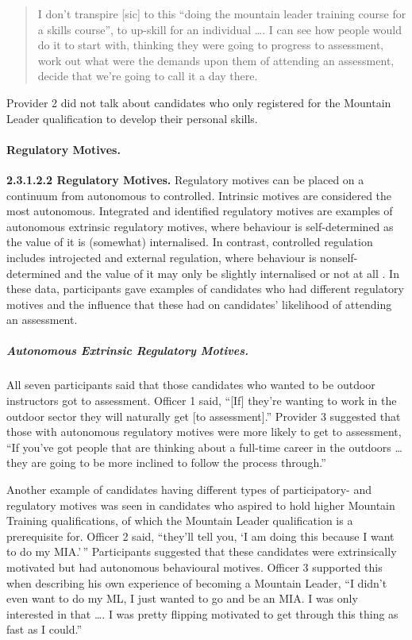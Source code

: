 \documentclass[
  12pt,
  a4paper,
]{book}
\begin{document}
\begin{quote}
I don't transpire {[}sic{]} to this ``doing the mountain leader training course for a skills course'', to up-skill for an individual \ldots. I can see how people would do it to start with, thinking they were going to progress to assessment, work out what were the demands upon them of attending an assessment, decide that we're going to call it a day there.
\end{quote}

Provider 2 did not talk about candidates who only registered for the Mountain Leader qualification to develop their personal skills.

\hypertarget{regulatory-motives.}{%
\paragraph{Regulatory Motives.}\label{regulatory-motives.}}

\textbf{2.3.1.2.2 Regulatory Motives.} Regulatory motives can be placed on a continuum from autonomous to controlled. Intrinsic motives are considered the most autonomous. Integrated and identified regulatory motives are examples of autonomous extrinsic regulatory motives, where behaviour is self-determined as the value of it is (somewhat) internalised. In contrast, controlled regulation includes introjected and external regulation, where behaviour is nonself-determined and the value of it may only be slightly internalised or not at all \citep{Deci2000}. In these data, participants gave examples of candidates who had different regulatory motives and the influence that these had on candidates' likelihood of attending an assessment.

\hypertarget{autonomous-extrinsic-regulatory-motives.}{%
\subparagraph{Autonomous Extrinsic Regulatory Motives.}\label{autonomous-extrinsic-regulatory-motives.}}

All seven participants said that those candidates who wanted to be outdoor instructors got to assessment. Officer 1 said, ``{[}If{]} they're wanting to work in the outdoor sector they will naturally get {[}to assessment{]}.'' Provider 3 suggested that those with autonomous regulatory motives were more likely to get to assessment, ``If you've got people that are thinking about a full-time career in the outdoors \ldots{} they are going to be more inclined to follow the process through.''

Another example of candidates having different types of participatory- and regulatory motives was seen in candidates who aspired to hold higher Mountain Training qualifications, of which the Mountain Leader qualification is a prerequisite for. Officer 2 said, ``they'll tell you, `I am doing this because I want to do my MIA.'\,'' Participants suggested that these candidates were extrinsically motivated but had autonomous behavioural motives. Officer 3 supported this when describing his own experience of becoming a Mountain Leader, ``I didn't even want to do my ML, I just wanted to go and be an MIA. I was only interested in that \ldots. I was pretty flipping motivated to get through this thing as fast as I could.''
\end{document}
